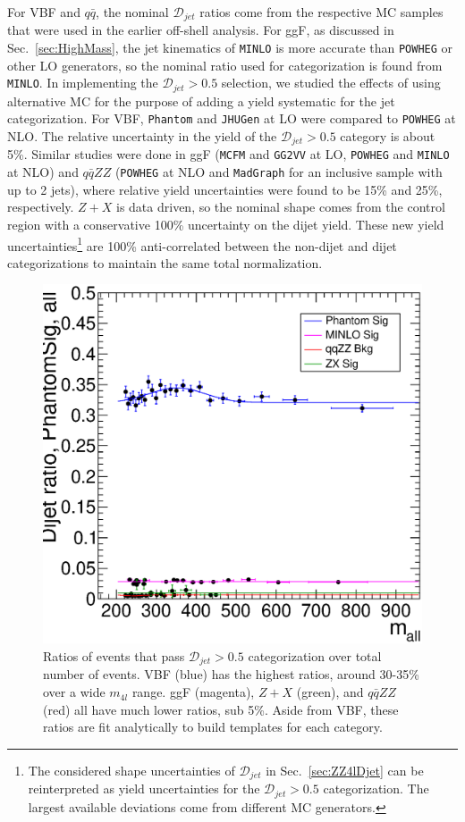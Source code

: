 For VBF and $q\bar{q}$, the nominal $\mathcal{D}_{jet}$ ratios come from the respective MC samples that were used in the earlier off-shell analysis. For ggF, as discussed in Sec.~\ref{sec:HighMass}, the jet kinematics of {\tt MINLO} is more accurate than {\tt POWHEG} or other LO generators, so the nominal ratio used for categorization is found from {\tt MINLO}. In implementing the $\mathcal{D}_{jet}>0.5$ selection, we studied the effects of using alternative MC for the purpose of adding a yield systematic for the jet categorization. For VBF, {\tt Phantom} and {\tt JHUGen} at LO were compared to {\tt POWHEG} at NLO. The relative uncertainty in the yield of the $\mathcal{D}_{jet}>0.5$ category is about 5\%. Similar studies were done in ggF ({\tt MCFM} and {\tt GG2VV} at LO, {\tt POWHEG} and {\tt MINLO} at NLO) and $q\bar{q}ZZ$ ({\tt POWHEG} at NLO and {\tt MadGraph} for an inclusive sample with up to 2 jets), where relative yield uncertainties were found to be 15\% and 25\%, respectively. $Z+X$ is data driven, so the nominal shape comes from the control region with a conservative 100\% uncertainty on the dijet yield. These new yield uncertainties\footnote{The considered shape uncertainties of $\mathcal{D}_{jet}$ in Sec.~\ref{sec:ZZ4lDjet} can be reinterpreted as yield uncertainties for the $\mathcal{D}_{jet}>0.5$ categorization. The largest available deviations come from different MC generators.} are 100\% anti-correlated between the non-dijet and dijet categorizations to maintain the same total normalization.

\begin{figure}[htbp]
\begin{center}
\includegraphics[width=.7\linewidth]{HiggsProperties/figures/DjetCutShapeOverlay_8TeV_Sig+Bkg_all.eps}
\caption[$D_{jet}>0.5$ Ratios for Production Separation in $f_{\Lambda Q}$ Measurement]{Ratios of events that pass $\mathcal{D}_{jet}>0.5$ categorization over total number of events. VBF (blue) has the highest ratios, around 30-35\% over a wide $m_{4l}$ range. ggF (magenta), $Z+X$ (green), and $q\bar{q}ZZ$ (red) all have much lower ratios, sub 5\%. Aside from VBF, these ratios are fit analytically to build templates for each category.}
\label{fig:DjetRatios}
\end{center}
\end{figure}

